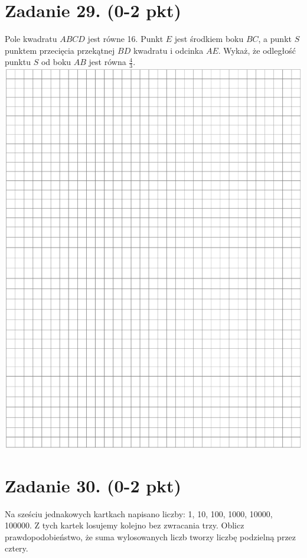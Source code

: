 \documentclass[10pt]{article}
\begin{document}
\section*{Zadanie 29. (0-2 pkt)}
Pole kwadratu \(A B C D\) jest równe 16. Punkt \(E\) jest środkiem boku \(B C\), a punkt \(S\) punktem przecięcia przekątnej \(B D\) kwadratu i odcinka \(A E\). Wykaż, że odległość punktu \(S\) od boku \(A B\) jest równa \(\frac{4}{3}\).\\
\includegraphics[max width=\textwidth, center]{2024_11_21_997c30e0b98e62837d84g-14}

\section*{Zadanie 30. (0-2 pkt)}
Na sześciu jednakowych kartkach napisano liczby: 1, 10, 100, 1000, 10000, 100000. Z tych kartek losujemy kolejno bez zwracania trzy. Oblicz prawdopodobieństwo, że suma wylosowanych liczb tworzy liczbę podzielną przez cztery.
\end{document}
